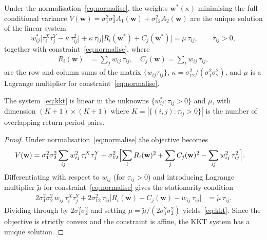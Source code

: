 \begin{thm}\label{thm:kkt}
Under the normalisation~\eqref{eq:normalise}, the weights
$\mathbf{w}^*(\kappa)$ minimising the full conditional variance
$V(\mathbf{w}) = \sigma_1^2\sigma_2^2 A_1(\mathbf{w})
              + \sigma_{12}^2 A_2(\mathbf{w})$
are the unique solution of the linear system
\begin{equation}\label{eq:kkt}
    w_{ij}^*\bigl[\tau_i^X \tau_j^Y - \kappa\,\tau_{ij}^2\bigr]
    + \kappa\,\tau_{ij}\bigl[R_i(\mathbf{w}^*) + C_j(\mathbf{w}^*)\bigr]
    = \mu\,\tau_{ij},
    \qquad \tau_{ij} > 0,
\end{equation}
together with constraint~\eqref{eq:normalise}, where
\begin{align*}
    R_i(\mathbf{w}) &= \sum_j w_{ij}\,\tau_{ij},\quad
    C_j(\mathbf{w}) = \sum_i w_{ij}\,\tau_{ij},
\end{align*}
are the row and column sums of the matrix $\{w_{ij}\tau_{ij}\}$,
$\kappa = \sigma_{12}^2/(\sigma_1^2\sigma_2^2)$,
and $\mu$ is a Lagrange multiplier for
constraint~\eqref{eq:normalise}.

The system~\eqref{eq:kkt} is linear in the unknowns
$\{w_{ij}^*: \tau_{ij}>0\}$ and $\mu$, with dimension
$(K+1)\times(K+1)$ where $K = |\{(i,j): \tau_{ij}>0\}|$
is the number of overlapping return-period pairs.
\end{thm}

\begin{proof}
Under normalisation~\eqref{eq:normalise} the objective becomes
\begin{align*}
    V(\mathbf{w}) &= \sigma_1^2\sigma_2^2
    \sum_{ij} w_{ij}^2\,\tau_i^X\tau_j^Y
    + \sigma_{12}^2
    \Bigl[\sum_i R_i(\mathbf{w})^2
         + \sum_j C_j(\mathbf{w})^2
         - \sum_{ij} w_{ij}^2\,\tau_{ij}^2\Bigr].
\end{align*}
Differentiating with respect to $w_{ij}$ (for $\tau_{ij}>0$)
and introducing Lagrange multiplier $\tilde\mu$ for
constraint~\eqref{eq:normalise} gives the stationarity condition
\begin{align*}
    2\sigma_1^2\sigma_2^2\,w_{ij}\,\tau_i^X\tau_j^Y
    + 2\sigma_{12}^2\,\tau_{ij}\bigl[R_i(\mathbf{w}) + C_j(\mathbf{w})
       - w_{ij}\,\tau_{ij}\bigr]
    &= \tilde\mu\,\tau_{ij}.
\end{align*}
Dividing through by $2\sigma_1^2\sigma_2^2$ and setting
$\mu = \tilde\mu/(2\sigma_1^2\sigma_2^2)$ yields~\eqref{eq:kkt}.
Since the objective is strictly convex and the constraint is
affine, the KKT system has a unique solution.
\end{proof}

